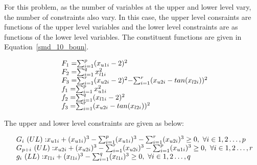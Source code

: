 For this problem, as the number of variables at the upper and lower level vary, the number of constraints also vary. In this case, the upper level consraints are functions of the upper level variables and the lower level constraints are as functions of the lower level variables. The constituent functions are given in Equation~\ref{smd_10_boun}.

\begin{equation}
\begin{array}{lr}
\text{}\hspace{2mm} F_1=$$\sum_{	i=1}^{p} (x_{u1i}-2)^{2} $$\\
\text{}\hspace{2mm} F_2=$$\sum_{	i=1}^{q} x_{l1i}^{2} $$\\
\text{}\hspace{2mm} F_3=$$\sum_{	i=1}^{r} (x_{u2i}-2)^{2} $$-$$\sum_{	i=1}^{r} (x_{u2i}-tan (x_{l2i}))^{2} $$\\

\text{}\hspace{2mm} f_1=$$\sum_{	i=1}^{p} x_{u1i}^{2} $$\\
\text{}\hspace{2mm} f_2=$$\sum_{	i=1}^{q} (x_{l1i}-2)^{2} $$\\
\text{}\hspace{2mm} f_3=$$\sum_{	i=1}^{r} (x_{u2i}-tan (x_{l2i}))^{2} $$\\

\end{array}
\label{smd_10_boun}
\end{equation}


The upper and lower level constraints are given as below:

\begin{equation}
\begin{array}{lr}
\text{}\hspace{2mm} {G_i~(UL):} x_{u1i}+ (x_{u1i})^{3} - \sum_{i=1}^{p} (x_{u1i})^{3} -\sum_{	i=1}^{r} (x_{u2i})^{3}\geq 0,~\forall i \in {1,2\ldots,p} \\
\text{}\hspace{2mm} {G_{p+i}~(UL):} x_{u2i}+ (x_{u2i})^{3} - \sum_{i=1}^{r} (x_{u2i})^{3} -\sum_{	i=1}^{p} (x_{u1i})^{3}\geq 0,~\forall i \in {1,2\ldots,r} \\

\text{}\hspace{2mm} {g_i~(LL):} x_{l1i}+ (x_{l1i})^{3} - \sum_{i=1}^{q} (x_{l1i})^{3} \geq 0,~\forall i \in {1,2\ldots,q} \\
\end{array}
\label{smd_10_con}
\end{equation}

